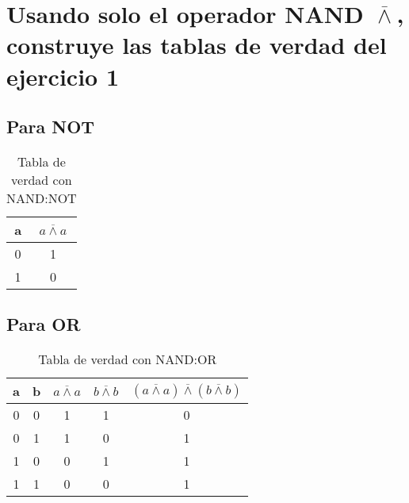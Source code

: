 \section{Usando solo el operador NAND $\overline{\wedge}$, construye las tablas de verdad del ejercicio 1}
\subsection{Para NOT}
\begin{table}[!ht]
    \centering
    \begin{tabular}{|c|c|}
        \hline
        a & \rule{0pt}{2.5ex}$a \overline{\wedge} a$ \\
        \hline
        0 & 1 \\
        \hline
        1 & 0 \\
        \hline
    \end{tabular}
    \caption{Tabla de verdad con NAND:NOT}\label{table:NAND-NOT}
\end{table}
\newpage
\subsection{Para OR}
\begin{table}[!ht]
    \centering
    \begin{tabular}{|c|c|c|c|c|}
        \hline
        a & b & \rule{0pt}{2.5ex}$a \overline{\wedge} a$ & $b \overline{\wedge} b$ & $(a \overline{\wedge} a) \overline{\wedge} (b \overline{\wedge} b)$ \\
        \hline
        0 & 0 & 1 & 1 & 0 \\
        \hline
        0 & 1 & 1 & 0 & 1 \\
        \hline
        1 & 0 & 0 & 1 & 1 \\
        \hline
        1 & 1 & 0 & 0 & 1 \\
        \hline
    \end{tabular}
    \caption{Tabla de verdad con NAND:OR}\label{table:NAND-OR}
\end{table}

